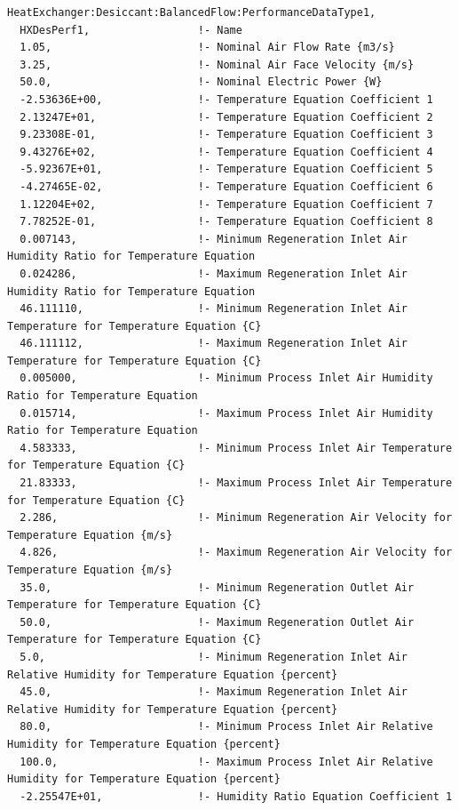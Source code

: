 \begin{lstlisting}
HeatExchanger:Desiccant:BalancedFlow:PerformanceDataType1,
  HXDesPerf1,                 !- Name
  1.05,                       !- Nominal Air Flow Rate {m3/s}
  3.25,                       !- Nominal Air Face Velocity {m/s}
  50.0,                       !- Nominal Electric Power {W}
  -2.53636E+00,               !- Temperature Equation Coefficient 1
  2.13247E+01,                !- Temperature Equation Coefficient 2
  9.23308E-01,                !- Temperature Equation Coefficient 3
  9.43276E+02,                !- Temperature Equation Coefficient 4
  -5.92367E+01,               !- Temperature Equation Coefficient 5
  -4.27465E-02,               !- Temperature Equation Coefficient 6
  1.12204E+02,                !- Temperature Equation Coefficient 7
  7.78252E-01,                !- Temperature Equation Coefficient 8
  0.007143,                   !- Minimum Regeneration Inlet Air Humidity Ratio for Temperature Equation
  0.024286,                   !- Maximum Regeneration Inlet Air Humidity Ratio for Temperature Equation
  46.111110,                  !- Minimum Regeneration Inlet Air Temperature for Temperature Equation {C}
  46.111112,                  !- Maximum Regeneration Inlet Air Temperature for Temperature Equation {C}
  0.005000,                   !- Minimum Process Inlet Air Humidity Ratio for Temperature Equation
  0.015714,                   !- Maximum Process Inlet Air Humidity Ratio for Temperature Equation
  4.583333,                   !- Minimum Process Inlet Air Temperature for Temperature Equation {C}
  21.83333,                   !- Maximum Process Inlet Air Temperature for Temperature Equation {C}
  2.286,                      !- Minimum Regeneration Air Velocity for Temperature Equation {m/s}
  4.826,                      !- Maximum Regeneration Air Velocity for Temperature Equation {m/s}
  35.0,                       !- Minimum Regeneration Outlet Air Temperature for Temperature Equation {C}
  50.0,                       !- Maximum Regeneration Outlet Air Temperature for Temperature Equation {C}
  5.0,                        !- Minimum Regeneration Inlet Air Relative Humidity for Temperature Equation {percent}
  45.0,                       !- Maximum Regeneration Inlet Air Relative Humidity for Temperature Equation {percent}
  80.0,                       !- Minimum Process Inlet Air Relative Humidity for Temperature Equation {percent}
  100.0,                      !- Maximum Process Inlet Air Relative Humidity for Temperature Equation {percent}
  -2.25547E+01,               !- Humidity Ratio Equation Coefficient 1

\end{lstlisting}
